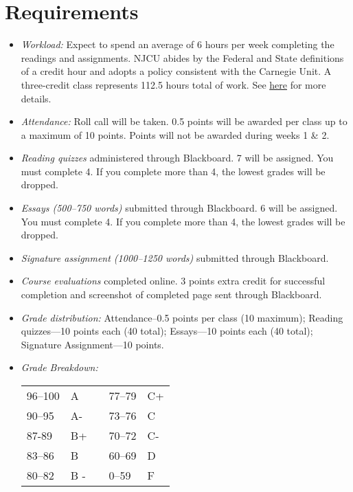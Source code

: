 \documentclass[article,oneside]{memoir}
\begin{document}
\section{Requirements}



\begin{itemize}
\item \textit{Workload:} Expect to spend an average of 6 hours per week completing the readings and assignments. NJCU abides by the Federal and State definitions of a credit hour and adopts a policy consistent with the Carnegie Unit. A three-credit class represents 112.5 hours total of work. See \href{http://scottoconnor.org/resources/Credit.pdf}{here} for more details.

\item \textit{Attendance:} Roll call will be taken. 0.5 points will be awarded per class up to a maximum of 10 points. Points will not be awarded during weeks 1 \& 2. 

\item \textit{Reading quizzes} administered through Blackboard. 7 will be assigned. You must complete 4. If you complete more than 4, the lowest grades will be dropped.  


\item \textit{Essays (500--750 words)} submitted through Blackboard.  6 will be assigned. You must complete 4. If you complete more than 4, the lowest grades will be dropped. 

\item \textit{Signature assignment (1000--1250 words)} submitted through Blackboard.

\item \textit{Course evaluations} completed online. 3 points extra credit for successful completion and screenshot of completed page sent through Blackboard. 
  
\item \textit{Grade distribution:} Attendance--0.5 points per class (10 maximum); Reading quizzes---10 points each (40 total);  Essays---10 points each (40 total); Signature Assignment---10 points.


\item \textit{Grade Breakdown:}

 \begin{tabular}{ | l | l | p{2cm} | l | l | }
    \hline 
96--100 & A  & &  77--79 &  C+ \\  
90--95 & A- & &  73--76 & C \\
87-89 & B+ &  &  70--72 & C- \\ 
83--86 & B  & &  60--69 & D\\
80--82 & B - & & 0--59 & F\\ \hline
    \end{tabular}


\end{itemize}
\end{document}
